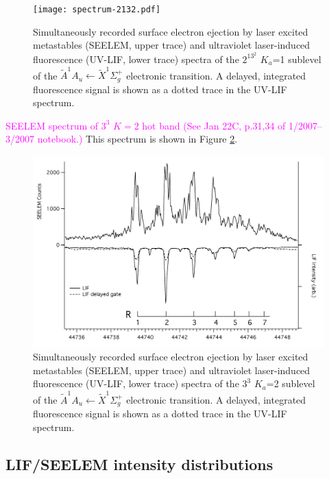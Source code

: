 \documentclass[12pt,draft]{mitthesis}
\newcommand{\POINT}[1]{\textcolor{magenta}{#1}}
\begin{document}
\begin{figure}
  \caption{
    Simultaneously recorded surface electron ejection by laser excited
    metastables (SEELEM, upper trace) and ultraviolet laser-induced
    fluorescence (UV-LIF, lower trace) spectra of the $2^13^2$ $K_a$=1
    sublevel of the $\tilde{A}^1A_u \leftarrow \tilde{X} ^1\Sigma_g^+$
    electronic transition. A delayed, integrated fluorescence signal
    is shown as a dotted trace in the UV-LIF spectrum.}
  \label{fig:spectrum-2132}
  \centering
  \texttt{[image: spectrum-2132.pdf]}
\end{figure}


\POINT{SEELEM spectrum of $3^3$ $K=2$ hot band (See Jan 22C, p.31,34
  of 1/2007--3/2007 notebook.)}  This spectrum is shown in Figure
\ref{fig:spectrum-33k2}.

\begin{figure}
  \caption{
    Simultaneously recorded surface electron ejection by laser excited
    metastables (SEELEM, upper trace) and ultraviolet laser-induced
    fluorescence (UV-LIF, lower trace) spectra of the $3^3$ $K_a$=2
    sublevel of the $\tilde{A}^1A_u \leftarrow \tilde{X} ^1\Sigma_g^+$
    electronic transition. A delayed, integrated fluorescence signal
    is shown as a dotted trace in the UV-LIF spectrum.}
  \label{fig:spectrum-33k2}
  \centering
  \includegraphics[width=8in,angle=90]{spectrum-33k2.png}
\end{figure}

\subsection{LIF/SEELEM intensity distributions}
\end{document}
